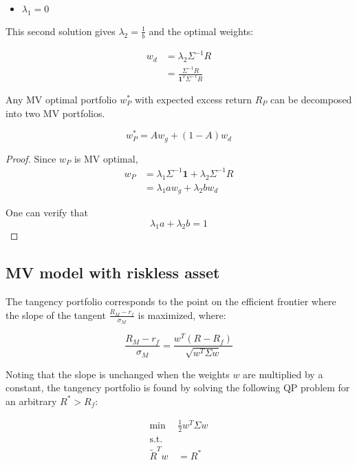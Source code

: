 \documentclass[
  11pt,
]{article}
\providecommand{\tightlist}{%
  \setlength{\itemsep}{0pt}\setlength{\parskip}{0pt}}
\begin{document}
\begin{itemize}
\tightlist
\item
  \(\lambda_1 = 0\)
\end{itemize}

This second solution gives \(\lambda_2 = \frac{1}{b}\) and the optimal
weights:

\begin{align*}
w_d & = \lambda_2 \Sigma^{-1} R \\
& = \frac{\Sigma^{-1} R}{\mathbf{1}^T\Sigma^{-1} R}
\end{align*}

\begin{thm}\label{thm:mv-1}
Any MV optimal portfolio $w^*_P$ with expected excess return $R_P$ can be decomposed into two MV portfolios.

$$
w^*_P = A w_g + (1-A) w_d
$$
\end{thm}

\begin{proof}
Since $w_P$ is MV optimal,
\begin{align*}
w_P &= \lambda_1 \Sigma^{-1} \mathbf{1}+ \lambda_2 \Sigma^{-1} R \\
&= \lambda_1 a w_g + \lambda_2 b w_d
\end{align*}

One can verify that
$$
\lambda_1 a  + \lambda_2 b = 1
$$
\end{proof}

\hypertarget{mv-model-with-riskless-asset}{%
\subsection{MV model with riskless
asset}\label{mv-model-with-riskless-asset}}

The tangency portfolio corresponds to the point on the efficient
frontier where the slope of the tangent \(\frac{R_M - r_f}{\sigma_M}\)
is maximized, where:

\[
\frac{R_M - r_f}{\sigma_M} = \frac{w^T (R - R_f)}{\sqrt{w^T \Sigma w}}
\]

Noting that the slope is unchanged when the weights \(w\) are multiplied
by a constant, the tangency portfolio is found by solving the following
QP problem for an arbitrary \(R^*>R_f\):

\[
\begin{aligned}
    \mbox{min} \ \ & \frac{1}{2} w^T \Sigma w  \\
    \mbox{s.t.} & \\
        \tilde{R}^Tw & = R^*
  \end{aligned}
\]
\end{document}
